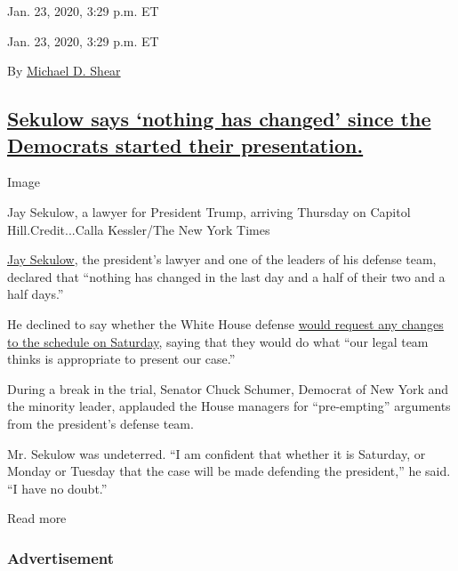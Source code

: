 Jan. 23, 2020, 3:29 p.m. ET

Jan. 23, 2020, 3:29 p.m. ET

By \href{https://www.nytimes3xbfgragh.onion/by/michael-d-shear}{Michael
D. Shear}

\hypertarget{sekulow-says-nothing-has-changed-since-the-democrats-started-their-presentation}{%
\subsection{\texorpdfstring{\protect\hyperlink{sekulow-says-nothing-has-changed-since-the-democrats-started-their-presentation}{Sekulow
says `nothing has changed' since the Democrats started their
presentation.}}{Sekulow says `nothing has changed' since the Democrats started their presentation.}}\label{sekulow-says-nothing-has-changed-since-the-democrats-started-their-presentation}}

Image

Jay Sekulow, a lawyer for President Trump, arriving Thursday on Capitol
Hill.Credit...Calla Kessler/The New York Times

\href{https://www.nytimes3xbfgragh.onion/2020/01/17/us/politics/jay-sekulow-trump-impeachment.html}{Jay
Sekulow}, the president's lawyer and one of the leaders of his defense
team, declared that ``nothing has changed in the last day and a half of
their two and a half days.''

He declined to say whether the White House defense
\href{https://www.nytimes3xbfgragh.onion/live/2020/impeachment-trial-live-01-23/an-abbreviated-weekend-trial-schedule-is-possible\#live-blog-list}{would
request any changes to the schedule on Saturday}, saying that they would
do what ``our legal team thinks is appropriate to present our case.''

During a break in the trial, Senator Chuck Schumer, Democrat of New York
and the minority leader, applauded the House managers for
``pre-empting'' arguments from the president's defense team.

Mr. Sekulow was undeterred. ``I am confident that whether it is
Saturday, or Monday or Tuesday that the case will be made defending the
president,'' he said. ``I have no doubt.''

Read more

\hypertarget{advertisement-4}{%
\subsubsection{Advertisement}\label{advertisement-4}}

